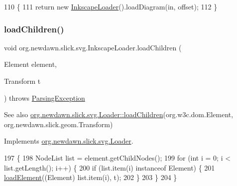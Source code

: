 \begin{DoxyCode}
110                                   \{
111         \textcolor{keywordflow}{return} \textcolor{keyword}{new} \mbox{\hyperlink{classorg_1_1newdawn_1_1slick_1_1svg_1_1_inkscape_loader_a02b783a62cfaf619034970a97679625a}{InkscapeLoader}}().loadDiagram(in, offset);
112     \}
\end{DoxyCode}
\mbox{\label{classorg_1_1newdawn_1_1slick_1_1svg_1_1_inkscape_loader_ac08d33005336e9ca1dedd9c092c35bcb}} 
\subsubsection{\texorpdfstring{load\+Children()}{loadChildren()}}
{\footnotesize\ttfamily void org.\+newdawn.\+slick.\+svg.\+Inkscape\+Loader.\+load\+Children (\begin{DoxyParamCaption}\item[{Element}]{element,  }\item[{Transform}]{t }\end{DoxyParamCaption}) throws \mbox{\hyperlink{classorg_1_1newdawn_1_1slick_1_1svg_1_1_parsing_exception}{Parsing\+Exception}}\hspace{0.3cm}{\ttfamily [inline]}}

\begin{DoxySeeAlso}{See also}
\mbox{\hyperlink{interfaceorg_1_1newdawn_1_1slick_1_1svg_1_1_loader_a8a49534ac01fc17297cc38db9c9d4cbb}{org.\+newdawn.\+slick.\+svg.\+Loader\+::load\+Children}}(org.\+w3c.\+dom.\+Element, org.\+newdawn.\+slick.\+geom.\+Transform) 
\end{DoxySeeAlso}


Implements \mbox{\hyperlink{interfaceorg_1_1newdawn_1_1slick_1_1svg_1_1_loader_a8a49534ac01fc17297cc38db9c9d4cbb}{org.\+newdawn.\+slick.\+svg.\+Loader}}.


\begin{DoxyCode}
197                                     \{
198         NodeList list = element.getChildNodes();
199         \textcolor{keywordflow}{for} (\textcolor{keywordtype}{int} i = 0; i < list.getLength(); i++) \{
200             \textcolor{keywordflow}{if} (list.item(i) instanceof Element) \{
201                 \mbox{\hyperlink{classorg_1_1newdawn_1_1slick_1_1svg_1_1_inkscape_loader_a003d181b8ad2fe05d1a9203ec11faea6}{loadElement}}((Element) list.item(i), t);
202             \}
203         \}
204     \}
\end{DoxyCode}
\mbox{\label{classorg_1_1newdawn_1_1slick_1_1svg_1_1_inkscape_loader_ad879b916430c92222760073b23ff6a16}} 
